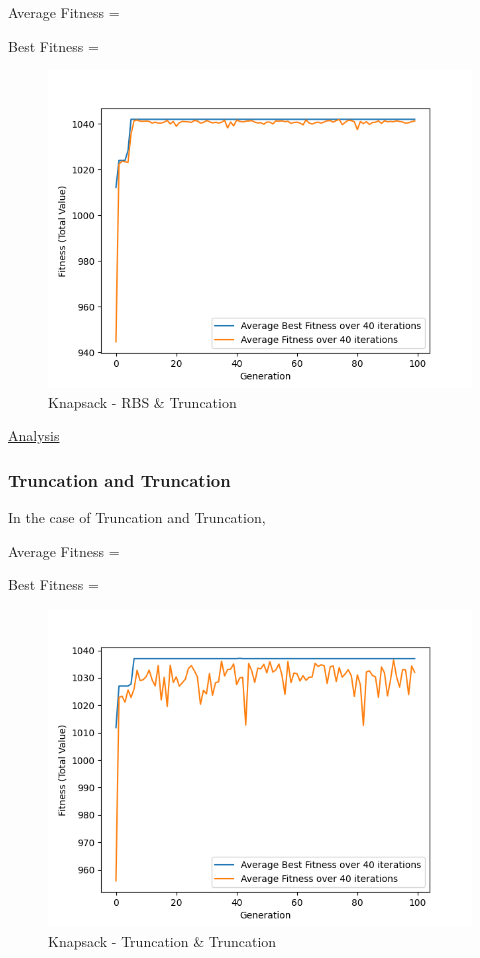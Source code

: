 \documentclass[11pt, letterpaper]{article}
\begin{document}
Average Fitness = 

Best Fitness = 
\begin{figure}[h]
    \centering
    \includegraphics[scale = 0.6]{images/knapsack_rb_tr.png}
    \caption {Knapsack - RBS \& Truncation}
    \label {fig:kpBT}
\end{figure}

\underline{Analysis}

\subsubsection {Truncation and Truncation}
In the case of Truncation and Truncation,

Average Fitness = 

Best Fitness = 
\begin{figure}[H]
    \centering
    \includegraphics[scale = 0.6]{images/knapsack_tr_tr.png}
    \caption {Knapsack - Truncation \& Truncation}
    \label {fig:kpTT}
\end{figure}
\end{document}
